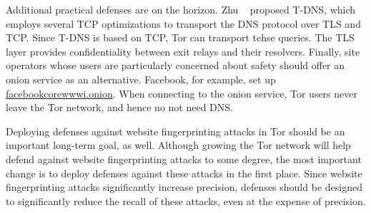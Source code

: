 Additional practical defenses are on the horizon.  Zhu \ea~\cite{Zhu2015a} proposed
T-DNS, which employs several TCP optimizations to transport the DNS protocol
over TLS and TCP.  Since T-DNS is based on TCP, Tor can transport tehse queries.
The TLS layer provides confidentiality between exit relays and their resolvers.
Finally, site operators whose users are particularly concerned about 
safety should offer an onion service as an alternative.  Facebook, for example,
set up \url{facebookcorewwwi.onion}.  When
connecting to the onion service, Tor users never leave the Tor network, and
hence no not need DNS.

Deploying defenses against website fingerprinting attacks in Tor should be an
important long-term goal, as well.
Although growing the Tor network will help defend against website
fingerprinting attacks to some degree, the most important change is to
deploy defenses against these attacks in the first place.  Since website
fingerprinting attacks significantly increase precision, defenses should
be designed to significantly reduce the recall of these attacks, even at
the expense of precision.

